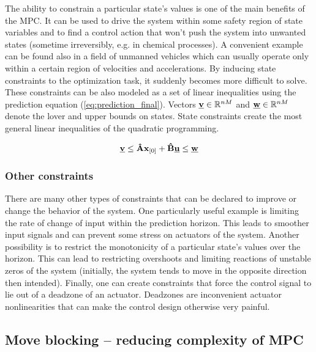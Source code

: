 The ability to constrain a particular state's values is one of the main benefits of the MPC. It can be used to drive the system within some safety region of state variables and to find a control action that won't push the system into unwanted states (sometime irreversibly, e.g. in chemical processes). A convenient example can be found also in a field of unmanned vehicles which can usually operate only within a certain region of velocities and accelerations. By inducing state constraints to the optimization task, it suddenly becomes more difficult to solve. These constraints can be also modeled as a set of linear inequalities using the prediction equation (\ref{eq:prediction_final}). Vectors $\textbf{\underline{v}} \in \mathbb{R}^{nM}$ and $\textbf{\underline{w}} \in \mathbb{R}^{nM}$ denote the lover and upper bounds on states. State constraints create the most general linear inequalities of the quadratic programming.
 
\begin{equation}
\textbf{\underline{v}} \leq \textbf{\^A}\textbf{x}_{[0]} + \textbf{\^B}\textbf{\underline{u}} \leq \textbf{\underline{w}}
\label{eq:qmpc_state_constraints}
\end{equation}

\subsubsection{Other constraints}

There are many other types of constraints that can be declared to improve or change the behavior of the system. One particularly useful example is limiting the rate of change of input within the prediction horizon. This leads to smoother input signals and can prevent some stress on actuators of the system. Another possibility is to restrict the monotonicity of a particular state's values over the horizon. This can lead to restricting overshoots and limiting reactions of unstable zeros of the system (initially, the system tends to move in the opposite direction then intended). Finally, one can create constraints that force the control signal to lie out of a deadzone of an actuator. Deadzones are inconvenient actuator nonlinearities that can make the control design otherwise very painful.

\subsection{Move blocking -- reducing complexity of MPC}

